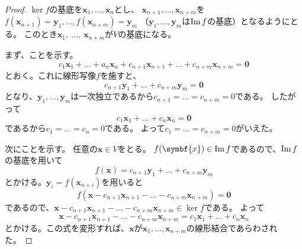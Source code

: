 \documentclass[../sotsu.tex]{subfiles}
\begin{document}
\begin{proof}
    $\ker f$の基底を$\symbf{x}_1, \dots, \symbf{x}_n$とし、
    $\symbf{x}_{n+1}, \dots, \symbf{x}_{n+m}$を
    $f(\symbf{x}_{n+1}) = \symbf{y}_1, \dots, f(\symbf{x}_{n+m}) = \symbf{y}_m$
    （$\symbf{y}_1, \dots, \symbf{y}_m$は$\operatorname{Im} f$の基底）となるようにとる。
    このとき$\symbf{x}_1, \  \dotsc, \  \symbf{x}_{n+m}$が$V$の基底になる。

    まず、ことを示す。
    \begin{equation*}
        c_1 \symbf{x}_1 + \dots + a_n \symbf{x}_n
            + c_{n+1} \symbf{x}_{n+1} + \dots + c_{n+m} \symbf{x}_{n+m}
                = \symbf{0}
    \end{equation*}
    とおく。これに線形写像$f$を施すと、
    \begin{equation*}
        c_{n+1} \symbf{y}_{1} + \dots + c_{n+m} \symbf{y}_{m} = \symbf{0}
    \end{equation*}
    となり、$\symbf{y}_1, \dots, \symbf{y}_m$は一次独立であるから$c_{n+1} = \dots = c_{n+m} = 0$である。
    したがって
    \begin{equation*}
        c_1 \symbf{x}_1 + \dots + c_n \symbf{x}_n = \symbf{0}
    \end{equation*}
    であるから$c_1 = \dots = c_n = 0$である。
    よって$c_1 = \dots = c_{n+m} = 0$がいえた。

    次にことを示す。
    任意の$\symbf{x} \in V$をとる。
    $f(\symbf{x}) \in \image f$であるので、$\operatorname{Im} f$の基底を用いて
    \begin{equation*}
        f(\symbf{x}) = c_{n+1} \symbf{y}_1 + \dots + c_{n+m} \symbf{y}_m
    \end{equation*}
    とかける。$\symbf{y}_i = f(\symbf{x}_{n+i})$を用いると
    \begin{equation*}
        f(\symbf{x} - c_{n+1} \symbf{x}_{n+1} - \dots - c_{n+m} \symbf{x}_{n+m}) = \symbf{0}
    \end{equation*}
    であるので、$\symbf{x} - c_{n+1} \symbf{x}_{n+1} - \dots - c_{n+m} \symbf{x}_{n+m} \in \ker f$である。
    よって
    \begin{equation*}
        \symbf{x} - c_{n+1} \symbf{x}_{n+1} - \dots - c_{n+m} \symbf{x}_{n+m} 
            = c_1 \symbf{x}_1 + \dots + c_n \symbf{x}_n
    \end{equation*}
    とかける。この式を変形すれば、$\symbf{x}$が$\symbf{x}_1, \dots, \symbf{x}_{n+m}$の線形結合であらわされた。
\end{proof}
\end{document}
